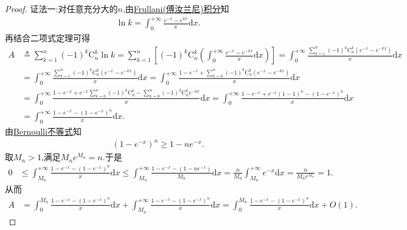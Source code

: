 \documentclass[../../main.tex]{subfiles}%
\begin{document}
\begin{proof}

{\color{blue}证法一:}对任意充分大的$n$,由\hyperref[theorem:Frullani(傅汝兰尼)积分]{Frullani(傅汝兰尼)积分}知
\begin{align*}
\ln k = \int_0^{+\infty}{\frac{e^{-x}-e^{kx}}{x}\mathrm{d}x}.
\end{align*}
再结合二项式定理可得
\begin{align*}
A&\triangleq \sum\limits_{k=1}^n{\left( -1 \right) ^k\mathrm{C}_{n}^{k}\ln k}=\sum\limits_{k=1}^n{\left[ \left( -1 \right) ^k\mathrm{C}_{n}^{k}\left( \int_0^{+\infty}{\frac{e^{-x}-e^{-kx}}{x}\mathrm{d}x} \right) \right]}=\int_0^{+\infty}{\frac{\sum\limits_{k=1}^n{\left( -1 \right) ^k\mathrm{C}_{n}^{k}}\left( e^{-x}-e^{-kx} \right)}{x}\mathrm{d}x} \\
&=\int_0^{+\infty}{\frac{\sum\limits_{k=1}^n{\left( -1 \right) ^k\mathrm{C}_{n}^{k}}\left( e^{-x}-e^{-kx} \right)}{x}\mathrm{d}x}=\int_0^{+\infty}{\frac{1-e^{-x}+\sum\limits_{k=0}^n{\left( -1 \right) ^k\mathrm{C}_{n}^{k}}\left( e^{-x}-e^{-kx} \right)}{x}\mathrm{d}x} \\
&=\int_0^{+\infty}{\frac{1-e^{-x}+e^{-x}\sum\limits_{k=0}^n{\left( -1 \right) ^k\mathrm{C}_{n}^{k}}-\sum\limits_{k=0}^n{\left( -1 \right) ^k\mathrm{C}_{n}^{k}}e^{-kx}}{x}\mathrm{d}x}=\int_0^{+\infty}{\frac{1-e^{-x}+e^{-x}\left( 1-1 \right) ^n-\left( 1-e^{-x} \right) ^n}{x}\mathrm{d}x} \\
&=\int_0^{+\infty}{\frac{1-e^{-x}-\left( 1-e^{-x} \right) ^n}{x}\mathrm{d}x}.
\end{align*}
由\hyperref[theorem:Bernoulli不等式]{Bernoulli不等式}知
\begin{align*}
\left( 1-e^{-x} \right) ^n\geqslant 1-ne^{-x}.
\end{align*}
取$M_n>1$,满足$M_ne^{M_n}=n$.于是
\begin{align*}
0&\leqslant \int_{M_n}^{+\infty}{\frac{1-e^{-x}-\left( 1-e^{-x} \right) ^n}{x}\mathrm{d}x}\leqslant \int_{M_n}^{+\infty}{\frac{1-e^{-x}-\left( 1-ne^{-x} \right)}{M_n}\mathrm{d}x}=\frac{n}{M_n}\int_{M_n}^{+\infty}{e^{-x}\mathrm{d}x}=\frac{n}{M_ne^{M_n}}=1.
\end{align*}
从而
\begin{align}
A&=\int_0^{M_n}{\frac{1-e^{-x}-\left( 1-e^{-x} \right) ^n}{x}\mathrm{d}x}+\int_{M_n}^{+\infty}{\frac{1-e^{-x}-\left( 1-e^{-x} \right) ^n}{x}\mathrm{d}x}=\int_0^{M_n}{\frac{1-e^{-x}-\left( 1-e^{-x} \right) ^n}{x}\mathrm{d}x}+O\left( 1 \right) .\label{eq:eq:::23589u2385tt10009}
\end{align}

\end{proof}
\end{document}
